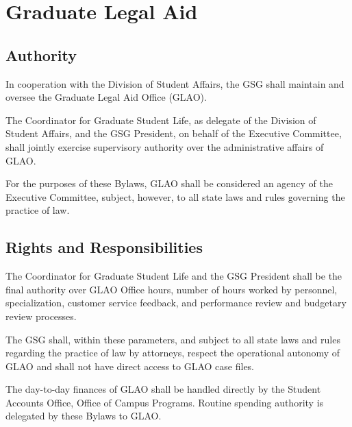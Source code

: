 \chapter{Graduate Legal Aid}

\section{Authority}
\begin{bylaws-number}
  \item In cooperation with the Division of Student Affairs, the GSG shall maintain and oversee the Graduate Legal Aid Office (GLAO).
  \item The Coordinator for Graduate Student Life, as delegate of the Division of Student Affairs, and the GSG President, on behalf of the Executive Committee, shall jointly exercise supervisory authority over the administrative affairs of GLAO.
  \item For the purposes of these Bylaws, GLAO shall be considered an agency of the Executive Committee, subject, however, to all state laws and rules governing the practice of law.
\end{bylaws-number}

\section{Rights and Responsibilities}
\begin{bylaws-number}
  \item The Coordinator for Graduate Student Life and the GSG President shall be the final authority over GLAO Office hours, number of hours worked by personnel, specialization, customer service feedback, and performance review and budgetary review processes.
  \item The GSG shall, within these parameters, and subject to all state laws and rules regarding the practice of law by attorneys, respect the operational autonomy of GLAO and shall not have direct access to GLAO case files.
  \item The day-to-day finances of GLAO shall be handled directly by the Student Accounts Office, Office of Campus Programs. Routine spending authority is delegated by these Bylaws to GLAO.
\end{bylaws-number}

